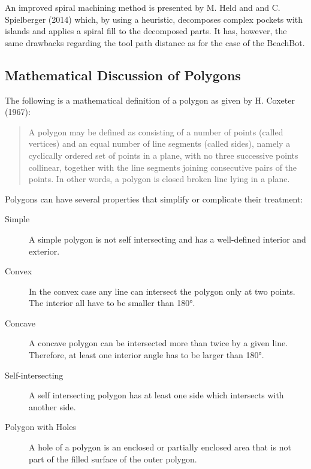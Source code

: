 An improved spiral machining method is presented by M. Held and and C. Spielberger (2014) \cite{held2014improved} which, by using a heuristic, decomposes complex pockets with islands and applies a spiral fill to the decomposed parts. It has, however, the same drawbacks regarding the tool path distance as \cite{held2009smooth} for the case of the BeachBot.



\subsection{Mathematical Discussion of Polygons}

The following is a mathematical definition of a polygon as given by H. Coxeter (1967)\cite{coxeter1967geometry}:

\begin{quotation}
A polygon may be defined as consisting of a number of points (called vertices) and an equal number of line segments (called sides), namely a cyclically ordered set of points in a plane, with no three successive points collinear, together with the line segments joining consecutive pairs of the points. In other words, a polygon is closed broken line lying in a plane.

\end{quotation}

Polygons can have several properties that simplify or complicate their treatment:

\begin{description}
\item[Simple] A simple polygon is not self intersecting and has a well-defined interior and exterior.\cite{weisstein_simple_p}
\item[Convex] In the convex case any line can intersect the polygon only at two points. The interior all have to be smaller than 180°.\cite{weisstein_convex_p}
\item[Concave] A concave polygon can be intersected more than twice by a given line. Therefore, at least one interior angle has to be larger than 180°.\cite{weisstein_concave_p}
\item[Self-intersecting] A self intersecting polygon has at least one side which intersects with another side.
\item[Polygon with Holes] A hole of a polygon is an enclosed or partially enclosed area that is not part of the filled surface of the outer polygon.
\end{description}

